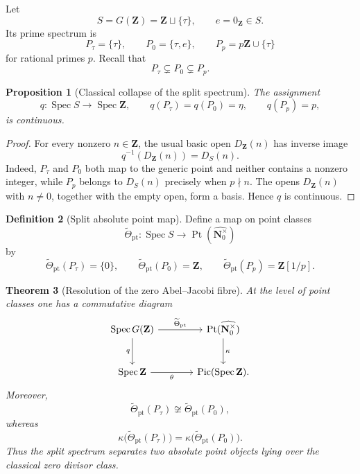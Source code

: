 \documentclass[11pt]{amsart}
\numberwithin{equation}{section}
\newtheorem{theorem}{Theorem}[section]
\newtheorem{proposition}[theorem]{Proposition}
\theoremstyle{definition}
\newtheorem{definition}[theorem]{Definition}
\newcommand{\Z}{\mathbf Z}
\newcommand{\N}{\mathbf N}
\newcommand{\Spec}{\operatorname{Spec}}
\begin{document}
Let
\[
S=G(\Z)=\Z\sqcup\{\tau\},
\qquad e=0_{\Z}\in S.
\]
Its prime spectrum is
\[
P_\tau=\{\tau\},
\qquad
P_0=\{\tau,e\},
\qquad
P_p=p\Z\cup\{\tau\}
\]
for rational primes $p$.  Recall that
\[
P_\tau\subsetneq P_0\subsetneq P_p.
\]

\begin{proposition}[Classical collapse of the split spectrum]
\label{prop:classical-collapse}
The assignment
\[
q:\Spec S\longrightarrow\Spec\Z,
\qquad
q(P_\tau)=q(P_0)=\eta,
\qquad
q(P_p)=p,
\]
is continuous.
\end{proposition}

\begin{proof}
For every nonzero $n\in\Z$, the usual basic open $D_{\Z}(n)$ has inverse
image
\[
q^{-1}(D_{\Z}(n))=D_S(n).
\]
Indeed, $P_\tau$ and $P_0$ both map to the generic point and neither
contains a nonzero integer, while $P_p$ belongs to $D_S(n)$ precisely when
$p\nmid n$.  The opens $D_{\Z}(n)$ with $n\neq0$, together with the empty
open, form a basis.  Hence $q$ is continuous.
\end{proof}

\begin{definition}[Split absolute point map]
\label{def:split-absolute-point-map}
Define a map on point classes
\[
\widetilde\Theta_{\mathrm{pt}}:\Spec S
\longrightarrow \operatorname{Pt}(\widehat{\N_0^\times})
\]
by
\[
\widetilde\Theta_{\mathrm{pt}}(P_\tau)=\{0\},
\qquad
\widetilde\Theta_{\mathrm{pt}}(P_0)=\Z,
\qquad
\widetilde\Theta_{\mathrm{pt}}(P_p)=\Z[1/p].
\]
\end{definition}

\begin{theorem}[Resolution of the zero Abel--Jacobi fibre]
\label{thm:abel-jacobi-resolution}
At the level of point classes one has a commutative diagram
\[
\begin{tikzcd}[column sep=large,row sep=large]
\Spec G(\Z)
  \arrow[r,"\widetilde\Theta_{\mathrm{pt}}"]
  \arrow[d,"q"']
& \operatorname{Pt}(\widehat{\N_0^\times})
  \arrow[d,"\kappa"]\\
\Spec\Z \arrow[r,"\theta"']
& \operatorname{Pic}(\Spec\Z).
\end{tikzcd}
\]
Moreover,
\[
\widetilde\Theta_{\mathrm{pt}}(P_\tau)
 \not\cong
\widetilde\Theta_{\mathrm{pt}}(P_0),
\]
whereas
\[
\kappa\bigl(\widetilde\Theta_{\mathrm{pt}}(P_\tau)\bigr)
=
\kappa\bigl(\widetilde\Theta_{\mathrm{pt}}(P_0)\bigr).
\]
Thus the split spectrum separates two absolute point objects lying over the
classical zero divisor class.
\end{theorem}
\end{document}
